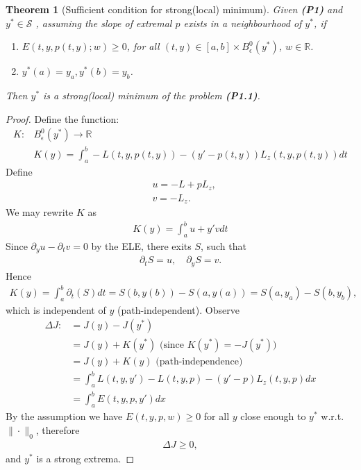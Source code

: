 \documentclass[a4paper,11pt,fleqn]{book}
\newtheorem{theorem}{Theorem}[section]
\theoremstyle{definition}
\theoremstyle{remark}
\begin{document}
\begin{theorem}[Sufficient condition for strong(local) minimum]
	Given \textbf{(P1)} and $y^* \in \mathcal{S} $ , assuming the slope of extremal $p$ exists in a neighbourhood of $y^*$, if 
	\begin{enumerate}
		\item $E(t, y, p(t, y); w ) \ge 0$,  for all $(t, y) \in [a, b] \times B^0_\epsilon (y^*)$,  $w \in \mathbb{R}$. 
		\item $y^*(a) = y_a, y^*(b) = y_b$. 
	\end{enumerate} 
	Then $y^*$ is a strong(local) minimum of the problem \textbf{(P1.1)}.
\end{theorem}
\begin{proof}
	Define the function: 
	\begin{align*}
		K: &B_\epsilon^0(y^*) \rightarrow \mathbb{R}\\
		   &K(y) = \int_a^b - L(t, y, p(t, y)) - (y' - p(t, y))L_z(t, y, p(t, y)) dt 
	\end{align*}
	Define
	\begin{align*}
		& u = -L + pL_z,\\
		& v = -L_z.
	\end{align*}
	We may rewrite $K$ as 
	\begin{align*}
		K(y) = \int_a^b u + y' v dt
	\end{align*}
	Since $\partial_y u - \partial_t v = 0$ by the ELE, there exits $S$, such that
	\begin{align*}
		\partial_t S = u,\quad \partial_y S = v.
	\end{align*}
	Hence
	\begin{align*}
		K(y) = \int_a^b \partial_t(S) dt = S(b, y(b)) - S(a, y(a)) = S(a, y_a) - S(b, y_b),
	\end{align*}
	which is independent of $y$ (path-independent). Observe
	\begin{align*}
		\Delta J: &= J(y) - J(y^*) \\
		& = J(y) + K(y^*)\text{ (since $K(y^*) = -J(y^*)$)}\\
		& = J(y) + K(y) \text{ (path-independence)}\\
		& = \int_a^b L(t, y, y') -L(t, y, p) - (y' - p)L_z(t, y, p)dx \\
		& = \int_a^b E(t, y, p, y') dx
	\end{align*}
	By the assumption we have $E(t, y, p, w) \ge 0$ for all $y$ close enough to $y^*$  w.r.t. $\|\cdot\|_0$, therefore
	\begin{align*}
		\Delta J \ge 0,
	\end{align*}
	and $y^*$ is a strong extrema.
\end{proof}
\end{document}
